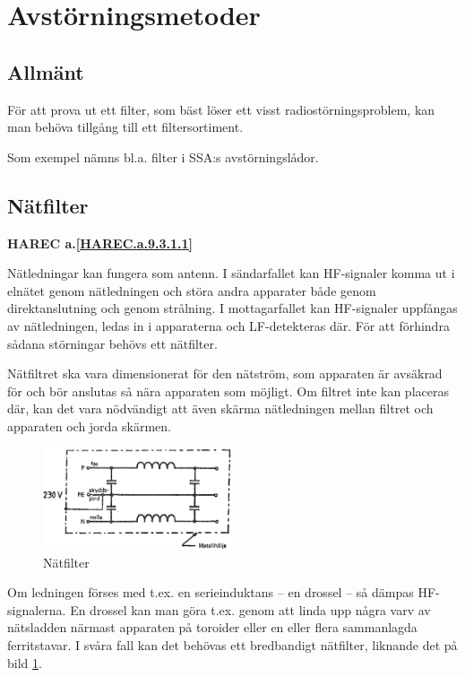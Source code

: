 \section{Avstörningsmetoder}

\subsection{Allmänt}
För att prova ut ett filter, som bäst löser ett visst radiostörningsproblem,
kan man behöva tillgång till ett filtersortiment.

Som exempel nämns bl.a. filter i SSA:s avstörningslådor.

\subsection{Nätfilter}
\textbf{
HAREC a.\ref{HAREC.a.9.3.1.1}\label{myHAREC.a.9.3.1.1}
}

Nätledningar kan fungera som antenn. I sändarfallet kan HF-signaler komma ut i
elnätet genom nätledningen och störa andra apparater både genom direktanslutning
och genom strålning. I mottagarfallet kan HF-signaler uppfångas av nätledningen,
ledas in i apparaterna och LF-detekteras där. För att förhindra sådana
störningar behövs ett nätfilter.

Nätfiltret ska vara dimensionerat för den nätström, som apparaten är avsäkrad
för och bör anslutas så nära apparaten som möjligt. Om filtret inte kan placeras
där, kan det vara nödvändigt att även skärma nätledningen mellan filtret och
apparaten och jorda skärmen.

\begin{figure}
  \includegraphics[width=0.5\textwidth]{images/cropped_pdfs/bild_2_9-01.pdf}
  \caption{Nätfilter}
  \label{fig:bildII9-1}
\end{figure}

Om ledningen förses med t.ex. en serieinduktans -- en drossel -- så dämpas
HF-signalerna. En drossel kan man göra t.ex. genom att linda upp några varv av
nätsladden närmast apparaten på toroider eller en eller flera sammanlagda
ferritstavar. I svåra fall kan det behövas ett bredbandigt nätfilter, liknande
det på bild \ref{fig:bildII9-1}.

